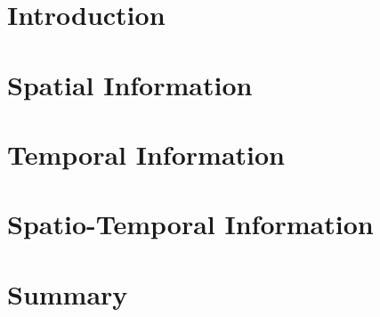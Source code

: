 \section*{Introduction}

\section{Spatial Information}

\section{Temporal Information}

\section{Spatio-Temporal Information}

\section*{Summary}



